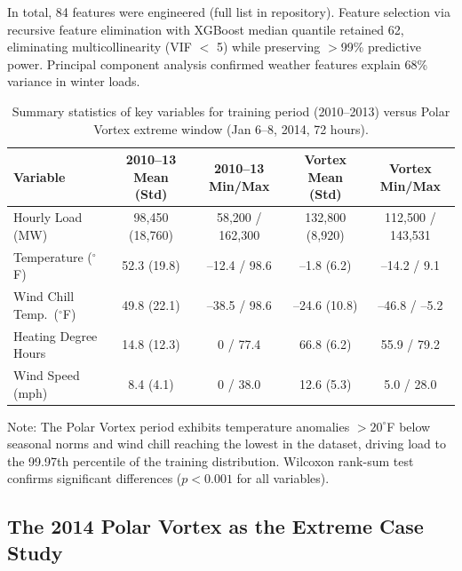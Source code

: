\documentclass[12pt,a4paper]{article}
\begin{document}
In total, 84 features were engineered (full list in repository). Feature selection via recursive feature elimination with XGBoost median quantile retained 62, eliminating multicollinearity (VIF $<$ 5) while preserving $>$99\% predictive power. Principal component analysis confirmed weather features explain 68\% variance in winter loads.

\begin{table}[H]
    \centering
    \caption{Summary statistics of key variables for training period (2010--2013) versus Polar Vortex extreme window (Jan 6--8, 2014, 72 hours).}
    \label{tab:table1}
    \small
    \begin{tabular}{lcccc}
        \toprule
        \textbf{Variable} & \textbf{2010--13 Mean (Std)} & \textbf{2010--13 Min/Max} & \textbf{Vortex Mean (Std)} & \textbf{Vortex Min/Max} \\
        \midrule
        Hourly Load (MW) & 98,450 (18,760) & 58,200 / 162,300 & 132,800 (8,920) & 112,500 / 143,531 \\
        Temperature ($^\circ$F) & 52.3 (19.8) & --12.4 / 98.6 & --1.8 (6.2) & --14.2 / 9.1 \\
        Wind Chill Temp.\ ($^\circ$F) & 49.8 (22.1) & --38.5 / 98.6 & --24.6 (10.8) & --46.8 / --5.2 \\
        Heating Degree Hours & 14.8 (12.3) & 0 / 77.4 & 66.8 (6.2) & 55.9 / 79.2 \\
        Wind Speed (mph) & 8.4 (4.1) & 0 / 38.0 & 12.6 (5.3) & 5.0 / 28.0 \\
        \bottomrule
    \end{tabular}
    \par\medskip\footnotesize
    Note: The Polar Vortex period exhibits temperature anomalies $>$$20^\circ$F below seasonal norms and wind chill reaching the lowest in the dataset, driving load to the 99.97th percentile of the training distribution. Wilcoxon rank-sum test confirms significant differences ($p < 0.001$ for all variables).
\end{table}

\subsection{The 2014 Polar Vortex as the Extreme Case Study}
\end{document}
